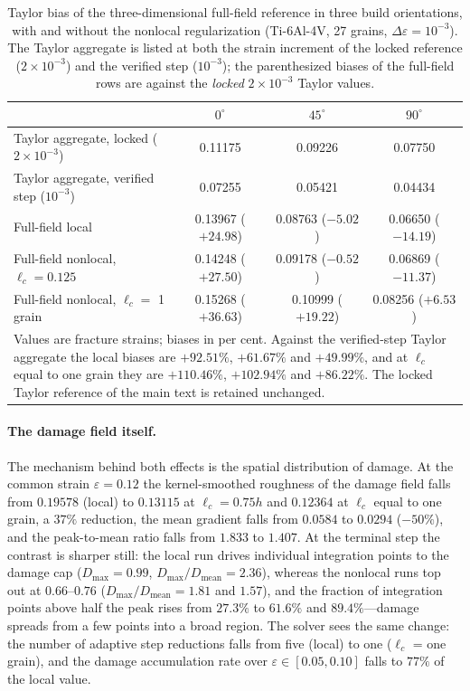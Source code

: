 \documentclass[12pt,a4paper,twocolumn]{article}
\providecommand{\ang}[1]{\ensuremath{#1^{\circ}}}
\begin{document}
\begin{table}[htbp]
\centering
\caption{Taylor bias of the three-dimensional full-field reference in three build orientations, with and
without the nonlocal regularization (Ti-6Al-4V, 27 grains, $\Delta\varepsilon = 10^{-3}$). The Taylor aggregate
is listed at both the strain increment of the locked reference ($2\times10^{-3}$) and the verified step
($10^{-3}$); the parenthesized biases of the full-field rows are against the \emph{locked} $2\times10^{-3}$
Taylor values.}
\label{tab:nonlocal_bias}
\footnotesize
\setlength{\tabcolsep}{3pt}
\begin{tabular}{p{}ccc}
\toprule
 & $\ang{0}$ & $\ang{45}$ & $\ang{90}$ \\
\midrule
Taylor aggregate, locked ($2\times10^{-3}$) & 0.11175 & 0.09226 & 0.07750 \\
Taylor aggregate, verified step ($10^{-3}$) & 0.07255 & 0.05421 & 0.04434 \\
Full-field local & 0.13967 ($+24.98$) & 0.08763 ($-5.02$) & 0.06650 ($-14.19$) \\
Full-field nonlocal, $\ell_c = 0.125$ & 0.14248 ($+27.50$) & 0.09178 ($-0.52$) & 0.06869 ($-11.37$) \\
Full-field nonlocal, $\ell_c = $ 1 grain & 0.15268 ($+36.63$) & 0.10999 ($+19.22$) & 0.08256 ($+6.53$) \\
\bottomrule
\multicolumn{4}{p{0.97\textwidth}}{\footnotesize Values are fracture strains; biases in per cent. Against the
verified-step Taylor aggregate the local biases are $+92.51\%$, $+61.67\%$ and $+49.99\%$, and at $\ell_c$ equal
to one grain they are $+110.46\%$, $+102.94\%$ and $+86.22\%$. The locked Taylor reference of the main text is
retained unchanged.}
\end{tabular}
\end{table}

\paragraph{The damage field itself.} The mechanism behind both effects is the spatial distribution of damage.
At the common strain $\varepsilon = 0.12$ the kernel-smoothed roughness of the damage field falls from $0.19578$
(local) to $0.13115$ at $\ell_c = 0.75h$ and $0.12364$ at $\ell_c$ equal to one grain, a $37\%$ reduction, the
mean gradient falls from $0.0584$ to $0.0294$ ($-50\%$), and the peak-to-mean ratio falls from $1.833$ to
$1.407$. At the terminal step the contrast is sharper still: the local run drives individual integration points
to the damage cap ($D_{\max} = 0.99$, $D_{\max}/D_{\mathrm{mean}} = 2.36$), whereas the nonlocal runs top out
at $0.66$--$0.76$ ($D_{\max}/D_{\mathrm{mean}} = 1.81$ and $1.57$), and the fraction of integration points
above half the peak rises from $27.3\%$ to $61.6\%$ and $89.4\%$---damage spreads from a few points into a
broad region. The solver sees the same change: the number of adaptive step reductions falls from five (local)
to one ($\ell_c$ = one grain), and the damage accumulation rate over $\varepsilon \in [0.05, 0.10]$ falls to
$77\%$ of the local value.
\end{document}
